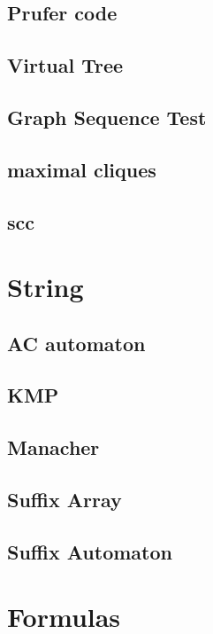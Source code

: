 \subsection{Prufer code}

%
\subsection{Virtual Tree}

\subsection{Graph Sequence Test}

\subsection{maximal cliques}

\subsection{scc}



\section{String}
\subsection{AC automaton}

\subsection{KMP}

\subsection{Manacher}

\subsection{Suffix Array}

\subsection{Suffix Automaton}


\section{Formulas}

